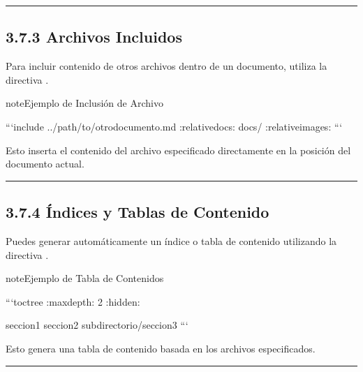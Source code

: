 \documentclass[a4paper,10pt,spanish]{sphinxmanual}
\begin{document}
\bigskip\hrule\bigskip



\subsection{3.7.3 Archivos Incluidos}
\label{\detokenize{3_guia_myst/organizacion_contenido:archivos-incluidos}}
\sphinxAtStartPar
Para incluir contenido de otros archivos dentro de un documento, utiliza la directiva .

\begin{sphinxadmonition}{note}{Ejemplo de Inclusión de Archivo}

\begin{sphinxVerbatim}[commandchars=\\\{\}]
```\PYGZob{}include\PYGZcb{} ../path/to/otro\PYGZus{}documento.md
:relative\PYGZhy{}docs: docs/
:relative\PYGZhy{}images:
```
\end{sphinxVerbatim}
\end{sphinxadmonition}

\sphinxAtStartPar
Esto inserta el contenido del archivo especificado directamente en la posición del documento actual.


\bigskip\hrule\bigskip



\subsection{3.7.4 Índices y Tablas de Contenido}
\label{\detokenize{3_guia_myst/organizacion_contenido:indices-y-tablas-de-contenido}}
\sphinxAtStartPar
Puedes generar automáticamente un índice o tabla de contenido utilizando la directiva .

\begin{sphinxadmonition}{note}{Ejemplo de Tabla de Contenidos}

\begin{sphinxVerbatim}[commandchars=\\\{\}]
```\PYGZob{}toctree\PYGZcb{}
:maxdepth: 2
:hidden:

seccion1
seccion2
subdirectorio/seccion3
```
\end{sphinxVerbatim}
\end{sphinxadmonition}

\sphinxAtStartPar
Esto genera una tabla de contenido basada en los archivos especificados.


\bigskip\hrule\bigskip
\end{document}
